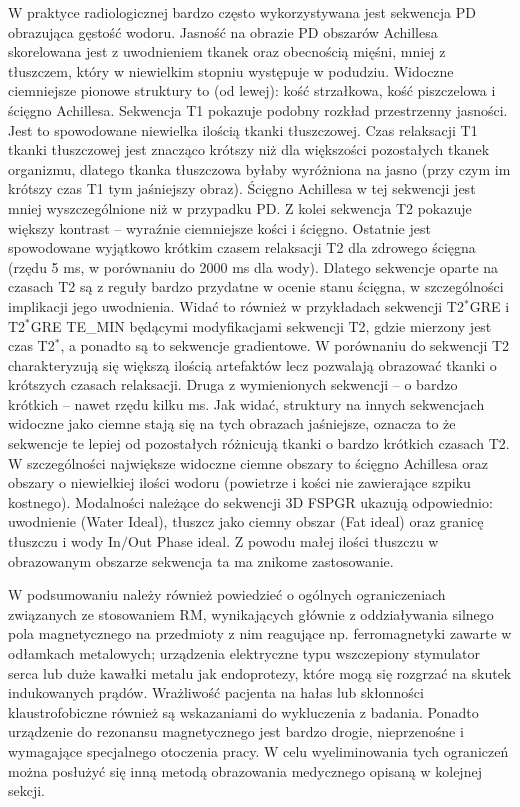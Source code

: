 W praktyce radiologicznej bardzo często wykorzystywana jest sekwencja PD obrazująca gęstość wodoru. Jasność na obrazie PD obszarów Achillesa skorelowana jest z uwodnieniem tkanek oraz obecnością mięśni, mniej z tłuszczem, który w niewielkim stopniu występuje w podudziu. Widoczne ciemniejsze pionowe struktury to (od lewej): kość strzałkowa, kość piszczelowa i ścięgno Achillesa. Sekwencja T1 pokazuje podobny rozkład przestrzenny jasności. Jest to spowodowane niewielka ilością tkanki tłuszczowej. Czas relaksacji T1 tkanki tłuszczowej jest znacząco krótszy niż dla większości pozostałych tkanek organizmu, dlatego tkanka tłuszczowa byłaby wyróżniona na jasno (przy czym im krótszy czas T1 tym jaśniejszy obraz). Ścięgno Achillesa w tej sekwencji jest mniej wyszczególnione niż w przypadku PD. Z kolei sekwencja T2 pokazuje większy kontrast -- wyraźnie ciemniejsze kości i ścięgno. Ostatnie jest spowodowane wyjątkowo krótkim czasem relaksacji T2 dla zdrowego ścięgna (rzędu 5 ms, w porównaniu do 2000 ms dla wody). Dlatego sekwencje oparte na czasach T2 są z reguły bardzo przydatne w ocenie stanu ścięgna, w szczególności implikacji jego uwodnienia. Widać to również w przykładach sekwencji T2$^\ast$GRE i T2$^\ast$GRE TE\_MIN będącymi modyfikacjami sekwencji T2, gdzie mierzony jest czas T2$^\ast$, a ponadto są to sekwencje gradientowe. W porównaniu do sekwencji T2 charakteryzują się większą ilością artefaktów lecz pozwalają obrazować tkanki o krótszych czasach relaksacji. Druga z wymienionych sekwencji -- o bardzo krótkich -- nawet rzędu kilku ms. Jak widać, struktury na innych sekwencjach widoczne jako ciemne stają się na tych obrazach jaśniejsze, oznacza to że sekwencje te lepiej od pozostałych różnicują tkanki o bardzo krótkich czasach T2. W szczególności największe widoczne ciemne obszary to ścięgno Achillesa oraz obszary o niewielkiej ilości wodoru (powietrze i kości nie zawierające szpiku kostnego). Modalności należące do sekwencji 3D FSPGR ukazują odpowiednio: uwodnienie (Water Ideal), tłuszcz jako ciemny obszar (Fat ideal) oraz granicę tłuszczu i wody In$/$Out Phase ideal. Z powodu małej ilości tłuszczu w obrazowanym obszarze sekwencja ta ma znikome zastosowanie.

W podsumowaniu należy również powiedzieć o ogólnych ograniczeniach związanych ze stosowaniem RM, wynikających głównie z oddziaływania silnego pola magnetycznego na przedmioty z nim reagujące np. ferromagnetyki zawarte w odłamkach metalowych; urządzenia elektryczne typu wszczepiony stymulator serca lub duże kawałki metalu jak endoprotezy, które mogą się rozgrzać na skutek indukowanych prądów. Wrażliwość pacjenta na hałas lub skłonności klaustrofobiczne również są wskazaniami do wykluczenia z badania. Ponadto urządzenie do rezonansu magnetycznego jest bardzo drogie, nieprzenośne i wymagające specjalnego otoczenia pracy. W celu wyeliminowania tych ograniczeń można posłużyć się inną metodą obrazowania medycznego opisaną w kolejnej sekcji. 

